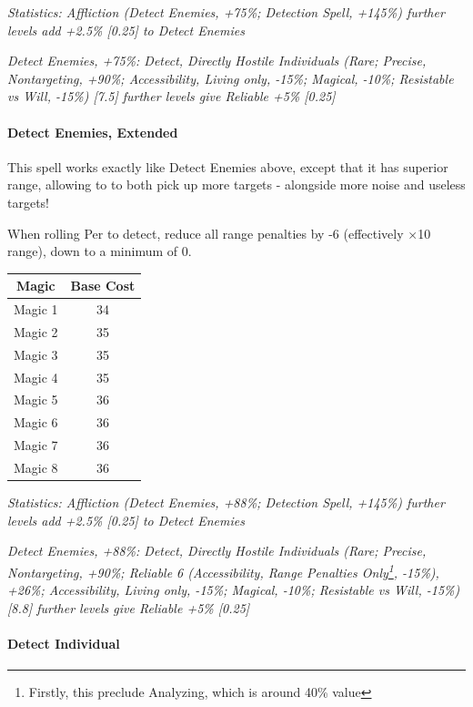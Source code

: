 \begin{multicols}{3}
	\textcolor{OliveGreen}{\textit{ Statistics: Affliction (Detect Enemies, +75\%; Detection Spell, +145\%) further levels add +2.5\% [0.25] to Detect Enemies}}
	
	\textcolor{OliveGreen}{\textit{Detect Enemies, +75\%: Detect, Directly Hostile Individuals (Rare; Precise, Nontargeting, +90\%; Accessibility, Living only, -15\%; Magical, -10\%; Resistable vs Will, -15\%) [7.5] further levels give Reliable +5\% [0.25]}}
	
	\paragraph{Detect Enemies, Extended}
	
	This spell works exactly like Detect Enemies above, except that it has superior range, allowing to to both pick up more targets - alongside more noise and useless targets!
	
	When rolling Per to detect, reduce all range penalties by -6 (effectively $\times$10 range), down to a minimum of 0.
	
	\begin{center}
		\begin{tabular}{|c|c|}
			\hline
			Magic & Base Cost \\
			\hline
			\hline
			Magic 1 & 34 \\
			Magic 2 & 35 \\
			Magic 3 & 35 \\
			Magic 4 & 35 \\
			Magic 5 & 36 \\
			Magic 6 & 36 \\
			Magic 7 & 36 \\
			Magic 8 & 36 \\
			\hline
		\end{tabular}
	\end{center} 
	
	\textcolor{OliveGreen}{\textit{ Statistics: Affliction (Detect Enemies, +88\%; Detection Spell, +145\%) further levels add +2.5\% [0.25] to Detect Enemies}}
	
	\textcolor{OliveGreen}{\textit{Detect Enemies, +88\%: Detect, Directly Hostile Individuals (Rare; Precise, Nontargeting, +90\%; Reliable 6 (Accessibility, Range Penalties Only\footnote{Firstly, this preclude Analyzing, which is around 40\% value}, -15\%), +26\%; Accessibility, Living only, -15\%; Magical, -10\%; Resistable vs Will, -15\%) [8.8] further levels give Reliable +5\% [0.25]}}
	
	\paragraph{Detect Individual}
		

\end{multicols}
